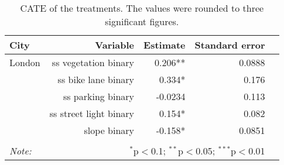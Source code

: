 \begin{table}[!htp]\centering
\caption{CATE of the treatments. The values were rounded to three significant figures.}\label{result:tab:cf}
\scriptsize
\begin{tabular}{lrrrr}\toprule
City&Variable&Estimate &Standard error \\ \midrule
London & ss vegetation binary & 0.206** & 0.0888 \\
 & ss bike lane binary & 0.334* & 0.176 \\
 & ss parking binary & -0.0234 & 0.113 \\
 & ss street light binary & 0.154* & 0.082 \\
 & slope binary & -0.158* & 0.0851 \\
\hline
\hline \\[-1.8ex]
\textit{Note:}  & \multicolumn{3}{r}{$^{*}$p$<$0.1; $^{**}$p$<$0.05; $^{***}$p$<$0.01} \\
\end{tabular}
\end{table}
